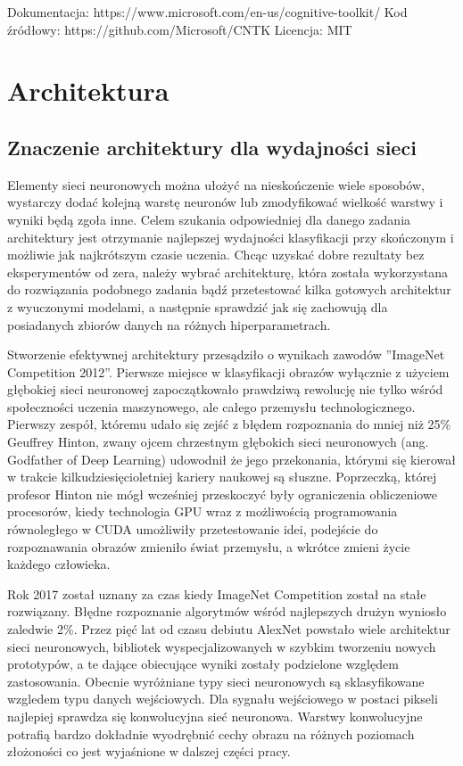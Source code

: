 \documentclass[12pt,a4paper,twoside,titlepage,openright]{book}
\begin{document}
\noindent
\newline
Dokumentacja: https://www.microsoft.com/en-us/cognitive-toolkit/
\newline
Kod źródłowy: https://github.com/Microsoft/CNTK
\newline
Licencja: MIT



\chapter{Architektura}
\section{Znaczenie architektury dla wydajności sieci}
Elementy sieci neuronowych można ułożyć na nieskończenie wiele sposobów, wystarczy dodać kolejną warstę neuronów lub zmodyfikować wielkość warstwy i wyniki będą zgoła inne. Celem szukania odpowiedniej dla danego zadania architektury jest otrzymanie najlepszej wydajności klasyfikacji przy skończonym i możliwie jak najkrótszym czasie uczenia. Chcąc uzyskać dobre rezultaty bez eksperymentów od zera, należy wybrać architekturę, która została wykorzystana do rozwiązania podobnego zadania bądź przetestować kilka gotowych architektur z wyuczonymi modelami, a następnie sprawdzić jak się zachowują dla posiadanych zbiorów danych na różnych hiperparametrach.

Stworzenie efektywnej architektury przesądziło o wynikach zawodów ''ImageNet Competition 2012''. Pierwsze miejsce w klasyfikacji obrazów wyłącznie z użyciem głębokiej sieci neuronowej zapoczątkowało prawdziwą rewolucję nie tylko wśród społeczności uczenia maszynowego, ale całego przemysłu technologicznego. Pierwszy zespół, któremu udało się zejść z błędem rozpoznania do mniej niż 25\% Geuffrey Hinton, zwany ojcem chrzestnym głębokich sieci neuronowych (ang. Godfather of Deep Learning) udowodnił że jego przekonania, którymi się kierował w trakcie kilkudziesięcioletniej kariery naukowej są słuszne. Poprzeczką, której profesor Hinton nie mógł wcześniej przeskoczyć były ograniczenia obliczeniowe procesorów, kiedy technologia GPU wraz z możliwością programowania równoległego w CUDA umożliwiły przetestowanie idei, podejście do rozpoznawania obrazów zmieniło świat przemysłu, a wkrótce zmieni życie każdego człowieka.

Rok 2017 został uznany za czas kiedy ImageNet Competition został na stałe rozwiązany. Błędne rozpoznanie algorytmów wśród najlepszych drużyn wyniosło zaledwie 2\%. Przez pięć lat od czasu debiutu AlexNet powstało wiele architektur sieci neuronowych, bibliotek wyspecjalizowanych w szybkim tworzeniu nowych prototypów, a te dające obiecujące wyniki zostały podzielone względem zastosowania. Obecnie wyróżniane typy sieci neuronowych są sklasyfikowane wzgledem typu danych wejściowych. Dla sygnału wejściowego w postaci pikseli najlepiej sprawdza się konwolucyjna sieć neuronowa. Warstwy konwolucyjne potrafią bardzo dokładnie wyodrębnić cechy obrazu na różnych poziomach złożoności co jest wyjaśnione w dalszej części pracy.
\end{document}
